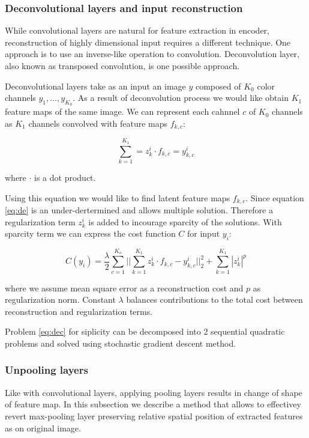 \subsubsection{Deconvolutional layers and input reconstruction}

While convolutional layers are natural for feature extraction in encoder, reconstruction of highly dimensional input requires a different technique.
One approach is to use an inverse-like operation to convolution.
Deconvolution layer, also known as transposed convolution, is one possible approach.

Deconvolutional layers \cite{Zeiler2010} take as an input an image $y$ composed of $K_0$ color channels $y_1, ... , y_{K_0}$.
As a result of deconvolution process we would like obtain $K_1$ feature maps of the same image.
We can represent each cahnnel $c$ of $K_0$ channels as $K_1$ channels convolved with feature maps $f_{k,c}$:

\begin{equation}\label{eq:de}
  \sum^{K_1}_{k=1}=z^i_k \cdot f_{k,c} = y^i_{k,c}
\end{equation}

where $\cdot$ is a dot product.

Using this equation we would like to find latent feature maps $f_{k,c}$.
Since equation \ref{eq:de} is an under-dertermined and allows multiple solution.
Therefore a regularization term $z^i_k$ is added to incourage sparcity of the solutions.
With sparcity term we can express the cost function $C$ for input $y_i$:

\begin{equation}\label{eq:dec}
    C(y_i) = \frac{\lambda}{2} \sum^{K_o}_{c=1} ||\sum^{K_1}_{k=1}{z^i_k \cdot f_{k,c} - y^i_{k,c}}||^2_2 + \sum^{K_1}_{k=1}{|z^i_k|^p}
\end{equation}

where we assume mean square error as a reconstruction cost and $p$ as regularization norm.
Constant $\lambda$ balances contributions to the total cost between reconstruction and regularization terms.

Problem \ref{eq:dec} for siplicity can be decomposed into 2 sequential quadratic problems and solved using stochastic gradient descent method.

\subsubsection{Unpooling layers}

Like with convolutional layers, applying pooling layers results in change of shape of feature map.
In this subsection we describe a method that allows to effectivey revert max-pooling layer preserving relative spatial position of extracted features as on original image.

